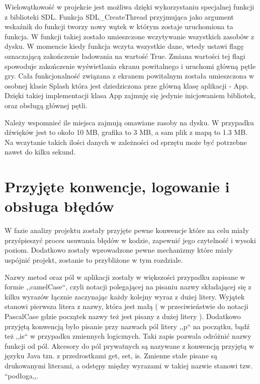 Wielowątkowość w projekcie jest możliwa dzięki wykorzystaniu specjalnej funkcji z biblioteki SDL. Funkcja SDL\_CreateThread przyjmująca jako argument wskaźnik do funkcji tworzy nowy wątek w którym zostaje uruchomiona ta funkcja. W funkcji takiej zostało umieszczone wczytywanie wszystkich zasobów z dysku. W momencie kiedy funkcja wczyta wszystkie dane, wtedy ustawi flagę oznaczającą zakończenie ładowania na wartość True. Zmiana wartości tej flagi spowoduje zakończenie wyświetlania ekranu powitalnego i uruchomi główną pętle gry. Cała funkcjonalność związana z ekranem powitalnym została umieszczona w osobnej klasie Splash która jest dziedziczona prze główną klasę aplikacji - App. Dzięki takiej implementacji klasa App zajmuję się jedynie inicjowaniem bibliotek, oraz obsługą głównej pętli. 

Należy wspomnieć ile miejsca zajmują omawiane zasoby na dysku. W przypadku  dźwięków jest to około 10 MB, grafika to 3 MB, a sam plik z mapą to 1.3 MB. Na wczytanie takich ilości danych w zależności od sprzętu może być potrzebne nawet do kilku sekund.

\section{Przyjęte konwencje, logowanie i obsługa błędów}
W fazie analizy projektu zostały przyjęte pewne konwencje które na celu miały przyśpieszyć proces usuwania błędów w kodzie, zapewnić jego czytelność i wysoki poziom. Dodatkowo zostały wprowadzone pewne mechanizmy które miały uspójnić projekt, zostanie to przybliżone w tym rozdziale. 


Nazwy metod oraz pól w aplikacji zostały w większości przypadku zapisane w formie ,,camelCase``, czyli notacji polegającej na pisaniu nazwy składającej się z kilku wyrazów łącznie zaczynając każdy kolejny wyraz z dużej litery. Wyjątek stanowi pierwsza litera z nazwy, która jest małą ( w przeciwieństwie do notacji PascalCase gdzie początek nazwy też jest pisany z dużej litery ). Dodatkowo przyjętą konwencją było pisanie przy nazwach pól litery ,,p`` na początku, bądź też ,,is`` w przypadku zmiennych logicznych. Taki zapis pozwala odróżnić nazwy funkcji od pól. Akcesory do pól prywatnych są nazywane z konwencją przyjętą w języku Java tzn. z przedrostkami get, set, is. Zmienne stałe pisane są drukowanymi literami, a odstępy między wyrazami w takiej nazwie stanowi tzw. ``podłoga,,.


